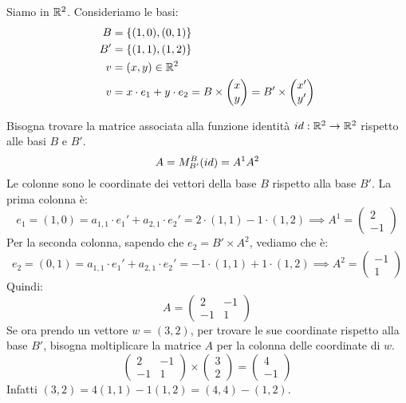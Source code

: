 \begin{exmp}
Siamo in $\mathbb{R}^2$. Consideriamo le basi:
\begin{align*}
B &= \{ (1,0), (0,1) \} \\
B' &= \{ (1,1), (1,2) \} \\
v &= (x,y) \in \mathbb{R}^2 \\
v &= x \cdot e_1 + y \cdot e_2 = B \times 
\begin{pmatrix}
x \\ y
\end{pmatrix} =
B' \times 
\begin{pmatrix}
x' \\ y'
\end{pmatrix}
\end{align*}

Bisogna trovare la matrice associata alla funzione identit\`a $id : \mathbb{R}^2 \to \mathbb{R}^2$ rispetto alle basi $B$ e $B'$.
\[
A = M_{B'}^{B} (id) = A^1 A^2
\]
Le colonne sono le coordinate dei vettori della base $B$ rispetto alla base $B'$. La prima colonna \`e:
\[
e_1 = (1,0) = a_{1,1} \cdot e_1' + a_{2,1} \cdot e_2' = 2 \cdot (1,1) - 1 \cdot (1,2) \implies A^1 = 
\begin{pmatrix}
2 \\ -1
\end{pmatrix}
\]
Per la seconda colonna, sapendo che $e_2 = B' \times A^2$, vediamo che \`e:
\[
e_2 = (0,1) = a_{1,1} \cdot e_1' + a_{2,1} \cdot e_2' = -1 \cdot (1,1) + 1 \cdot (1,2) \implies A^2 = 
\begin{pmatrix}
-1 \\ 1
\end{pmatrix}
\]
Quindi:
\[
A = 
\begin{pmatrix}
2 & -1 \\
-1 & 1
\end{pmatrix}
\]
Se ora prendo un vettore $w = (3,2)$, per trovare le sue coordinate rispetto alla base $B'$, bisogna moltiplicare la matrice $A$ per la colonna delle coordinate di $w$.
\[
\begin{pmatrix}
2 & -1 \\
-1 & 1
\end{pmatrix}
\times
\begin{pmatrix}
3 \\ 2
\end{pmatrix}
=
\begin{pmatrix}
4 \\ -1
\end{pmatrix}
\]
Infatti $(3,2) = 4 (1,1) - 1 (1,2) = (4,4) - (1,2)$.
\end{exmp}

